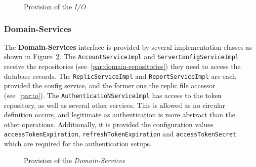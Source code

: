 \begin{figure}
    \centering

    \caption{Provision of the \textit{I/O}}
    \label{fig:domain-io-p}
\end{figure}

\subsubsection{Domain-Services}
The \textbf{Domain-Services} interface is provided by several implementation classes as shown in Figure~\ref{fig:domain-services-p}. \newline
The \texttt{AccountServiceImpl} and \texttt{ServerConfigServiceImpl} receive the repositories (see~\ref{par:domain-repositories}) they need to access the database records. \newline
The \texttt{ReplicServiceImpl} and \texttt{ReportServiceImpl} are each provided the config service, and the former one the replic file accessor (see~\ref{par:io}). \newline
The \texttt{AuthenticatioNServiceImpl} has access to the token repository, as well as several other services.
This is allowed as no circular definition occurs, and legitimate as authentication is more abstract than the other operations.
Additionally, it is provided the configuration values \texttt{accessTokenExpiration}, \texttt{refreshTokenExpiration} and \texttt{accessTokenSecret} which are required for the authentication setups.

\begin{figure}
    \centering

    \caption{Provision of the \textit{Domain-Services}}
    \label{fig:domain-services-p}
\end{figure}